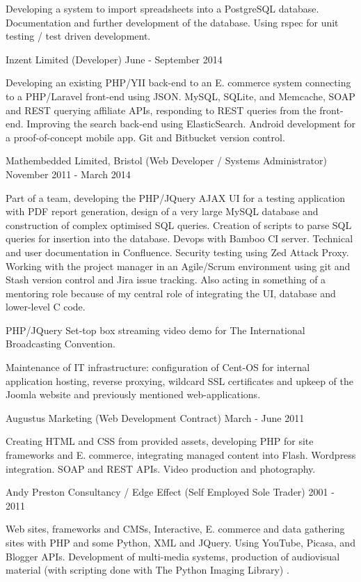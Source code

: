Developing a 
system to import spreadsheets into a PostgreSQL database.
Documentation and further development of the database.
Using rspec for unit testing / test driven development.

\jobHeading
    {Inzent Limited (Developer)}
    {June - September 2014}

Developing an existing PHP/YII back-end to an
E. commerce system connecting to a PHP/Laravel front-end using JSON.
MySQL, SQLite, and Memcache, SOAP and REST querying affiliate APIs,
responding to REST queries from the front-end.
Improving the search back-end using ElasticSearch.
Android development for a proof-of-concept mobile app.
Git and Bitbucket version control.

\jobHeading
    {Mathembedded Limited, Bristol (Web Developer / Systems Administrator)}
    {November 2011 - March 2014}

Part of a team, developing the PHP/JQuery AJAX UI
for a testing application with PDF report generation,
design of a very large MySQL database
and construction of complex optimised SQL queries.
Creation of  scripts
to parse SQL queries for insertion into the database.
Devops with Bamboo CI server.
Technical and user documentation in Confluence.
Security testing using Zed Attack Proxy.
Working with the project manager in an Agile/Scrum environment
using git and Stash version control and Jira issue tracking.
Also acting in something of a mentoring role
because of my central role of integrating the UI,
database and lower-level C code.

PHP/JQuery Set-top box streaming video demo for
The International Broadcasting Convention.

Maintenance of IT infrastructure:
configuration of Cent-OS for internal application hosting,
reverse proxying, wildcard SSL certificates
and upkeep of the Joomla website
and previously mentioned web-applications.

\jobHeading
    {Augustus Marketing (Web Development Contract)}
    {March - June 2011}

Creating HTML and CSS from provided assets,
developing PHP for site frameworks and E. commerce,
integrating managed content into Flash.
Wordpress integration.
SOAP and REST APIs.
Video production and photography.

\jobHeading
    {Andy Preston Consultancy / Edge Effect (Self Employed Sole Trader)}
    {2001 - 2011}

Web sites, frameworks and CMSs, Interactive, E. commerce and
data gathering sites with PHP and some Python, XML and JQuery.
Using YouTube, Picasa, and Blogger APIs.
Development of multi-media systems, production of audiovisual
material\ifnum{}
    { (with scripting done with The Python Imaging Library)}
\fi.

